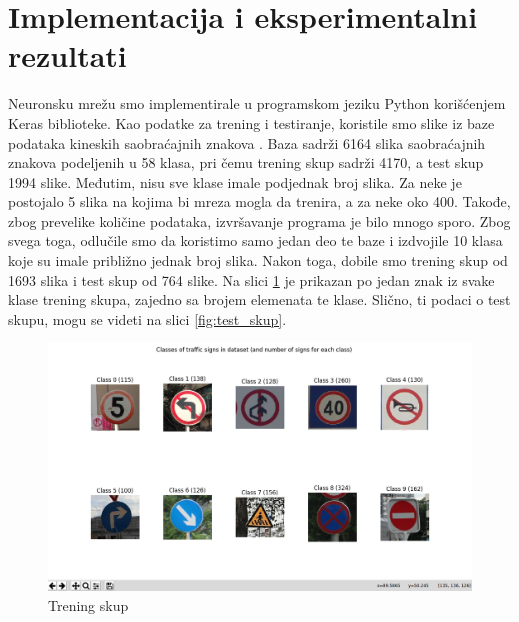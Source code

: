 \documentclass[a4paper]{article}
\begin{document}
\section{Implementacija i eksperimentalni rezultati}
\label{sec:podnaslov8}


Neuronsku mrežu smo implementirale u programskom jeziku Python korišćenjem Keras biblioteke. Kao podatke za trening i testiranje, koristile smo slike iz baze podataka kineskih saobraćajnih znakova \cite{CTSD}. Baza sadrži 6164 slika saobraćajnih znakova podeljenih u 58 klasa, pri čemu trening skup sadrži 4170, a test skup 1994 slike. Međutim, nisu sve klase imale podjednak broj slika. Za neke je postojalo 5 slika na kojima bi mreza mogla da trenira, a za neke oko 400. Takođe, zbog prevelike količine podataka, izvršavanje programa je bilo mnogo sporo. Zbog svega toga, odlučile smo da koristimo samo jedan deo te baze i izdvojile 10 klasa koje su imale približno jednak broj slika. Nakon toga, dobile smo trening skup od 1693 slika i test skup od 764 slike. Na slici \ref{fig:trening_skup} je prikazan po jedan znak iz svake klase trening skupa, zajedno sa brojem elemenata te klase. Slično, ti podaci o test skupu, mogu se videti na slici \ref{fig:test_skup}.

\begin{figure}[h!]
\begin{center}
\includegraphics[scale=0.25]{trening_skup.png}
\end{center}
\caption{Trening skup}
\label{fig:trening_skup}
\end{figure}
\end{document}
